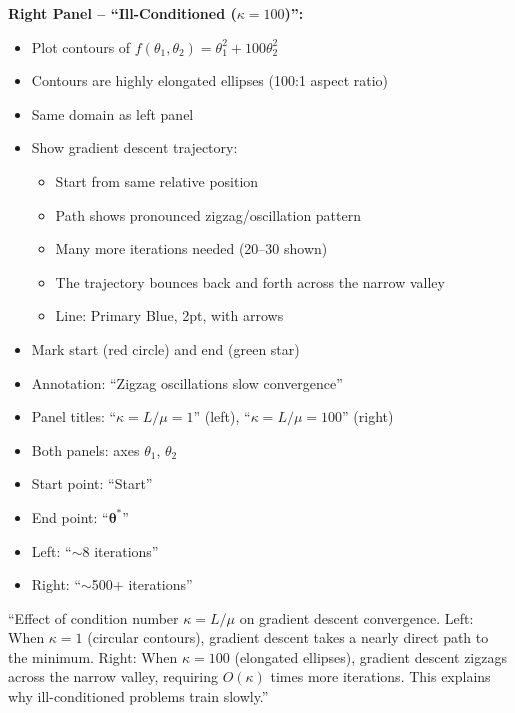 \documentclass[12pt]{article}
\begin{document}
\begin{description}[style=nextline, leftmargin=0pt]
    \textbf{Right Panel -- ``Ill-Conditioned ($\kappa = 100$)'':}
    \begin{itemize}
        \item Plot contours of $f(\theta_1, \theta_2) = \theta_1^2 + 100\theta_2^2$
        \item Contours are highly elongated ellipses (100:1 aspect ratio)
        \item Same domain as left panel
        \item Show gradient descent trajectory:
        \begin{itemize}
            \item Start from same relative position
            \item Path shows pronounced zigzag/oscillation pattern
            \item Many more iterations needed (20--30 shown)
            \item The trajectory bounces back and forth across the narrow valley
            \item Line: Primary Blue, 2pt, with arrows
        \end{itemize}
        \item Mark start (red circle) and end (green star)
        \item Annotation: ``Zigzag oscillations slow convergence''
    \end{itemize}

    \item[Required Labels]
    \begin{itemize}
        \item Panel titles: ``$\kappa = L/\mu = 1$'' (left), ``$\kappa = L/\mu = 100$'' (right)
        \item Both panels: axes $\theta_1$, $\theta_2$
        \item Start point: ``Start''
        \item End point: ``$\boldsymbol{\theta}^*$''
        \item Left: ``$\sim$8 iterations''
        \item Right: ``$\sim$500+ iterations''
    \end{itemize}

    \item[Caption Text]
    ``Effect of condition number $\kappa = L/\mu$ on gradient descent convergence. Left: When $\kappa = 1$ (circular contours), gradient descent takes a nearly direct path to the minimum. Right: When $\kappa = 100$ (elongated ellipses), gradient descent zigzags across the narrow valley, requiring $O(\kappa)$ times more iterations. This explains why ill-conditioned problems train slowly.''


\end{description}
\end{document}
